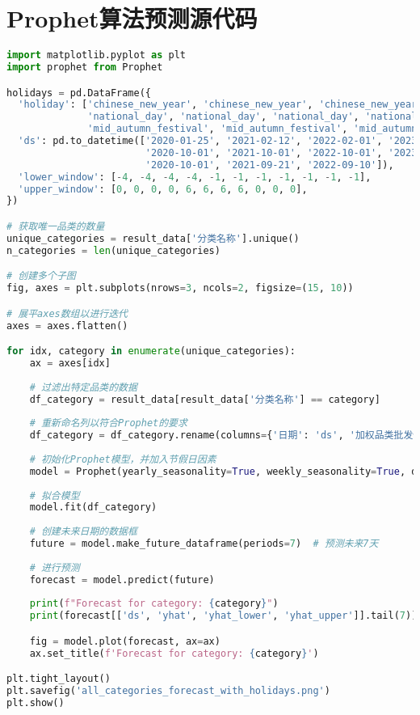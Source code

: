 \documentclass[withoutpreface,bwprint]{cumcmthesis} %
\begin{document}
\section{Prophet算法预测源代码}
\begin{lstlisting}[language=python]
import matplotlib.pyplot as plt
import prophet from Prophet

holidays = pd.DataFrame({
  'holiday': ['chinese_new_year', 'chinese_new_year', 'chinese_new_year', 'chinese_new_year', 
              'national_day', 'national_day', 'national_day', 'national_day',
              'mid_autumn_festival', 'mid_autumn_festival', 'mid_autumn_festival'],
  'ds': pd.to_datetime(['2020-01-25', '2021-02-12', '2022-02-01', '2023-01-22',
                        '2020-10-01', '2021-10-01', '2022-10-01', '2023-10-01',
                        '2020-10-01', '2021-09-21', '2022-09-10']),
  'lower_window': [-4, -4, -4, -4, -1, -1, -1, -1, -1, -1, -1],
  'upper_window': [0, 0, 0, 0, 6, 6, 6, 6, 0, 0, 0],
})

# 获取唯一品类的数量
unique_categories = result_data['分类名称'].unique()
n_categories = len(unique_categories)

# 创建多个子图
fig, axes = plt.subplots(nrows=3, ncols=2, figsize=(15, 10))

# 展平axes数组以进行迭代
axes = axes.flatten()

for idx, category in enumerate(unique_categories):
    ax = axes[idx]
    
    # 过滤出特定品类的数据
    df_category = result_data[result_data['分类名称'] == category]
    
    # 重新命名列以符合Prophet的要求
    df_category = df_category.rename(columns={'日期': 'ds', '加权品类批发价格': 'y'})
    
    # 初始化Prophet模型，并加入节假日因素
    model = Prophet(yearly_seasonality=True, weekly_seasonality=True, daily_seasonality=False, holidays=holidays)
    
    # 拟合模型
    model.fit(df_category)
    
    # 创建未来日期的数据框
    future = model.make_future_dataframe(periods=7)  # 预测未来7天
    
    # 进行预测
    forecast = model.predict(future)
    
    print(f"Forecast for category: {category}")
    print(forecast[['ds', 'yhat', 'yhat_lower', 'yhat_upper']].tail(7))

    fig = model.plot(forecast, ax=ax)
    ax.set_title(f'Forecast for category: {category}')

plt.tight_layout()
plt.savefig('all_categories_forecast_with_holidays.png')
plt.show()
 \end{lstlisting}
\end{document}
